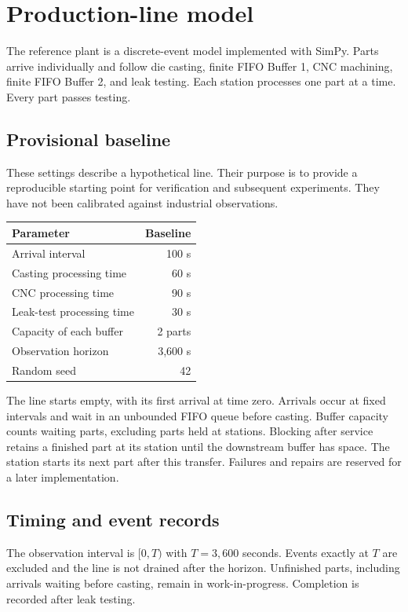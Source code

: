 \section{Production-line model}

The reference plant is a discrete-event model implemented with SimPy. Parts
arrive individually and follow die casting, finite FIFO Buffer 1, CNC
machining, finite FIFO Buffer 2, and leak testing. Each station processes
one part at a time. Every part passes testing.

\subsection{Provisional baseline}
These settings describe a hypothetical line. Their purpose is to provide a
reproducible starting point for verification and subsequent experiments.
They have not been calibrated against industrial observations.

\begin{center}
\begin{tabular}{lr}
Parameter & Baseline \\
\hline
Arrival interval & 100 s \\
Casting processing time & 60 s \\
CNC processing time & 90 s \\
Leak-test processing time & 30 s \\
Capacity of each buffer & 2 parts \\
Observation horizon & 3,600 s \\
Random seed & 42 \\
\end{tabular}
\end{center}

The line starts empty, with its first arrival at time zero. Arrivals occur
at fixed intervals and wait in an unbounded FIFO queue before casting.
Buffer capacity counts waiting parts, excluding parts held at stations.
Blocking after service retains a finished part at its station until the
downstream buffer has space. The station starts its next part after this
transfer. Failures and repairs are reserved for a later implementation.

\subsection{Timing and event records}
The observation interval is $[0,T)$ with $T=3{,}600$ seconds. Events exactly
at $T$ are excluded and the line is not drained after the horizon.
Unfinished parts, including arrivals waiting before casting, remain in
work-in-progress. Completion is recorded after leak testing.

